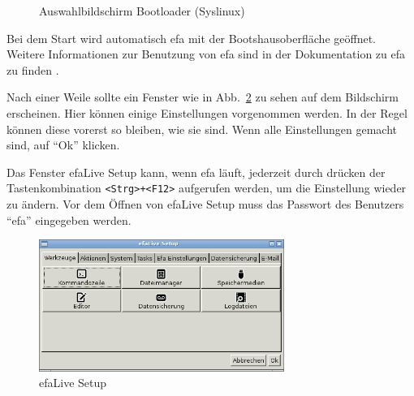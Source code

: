 \documentclass[a4paper,12pt,twoside]{article}
\begin{document}
\begin{figure}
    \centering
    \caption{Auswahlbildschirm Bootloader (Syslinux)}
    \label{fig:syslinux}
\end{figure}

Bei dem Start wird automatisch efa mit der Bootshausoberfläche geöffnet.
Weitere Informationen zur Benutzung von efa sind in der Dokumentation
zu efa zu finden \cite{EFA2}.

Nach einer Weile sollte ein Fenster wie in Abb.~\ref{fig:efalivesetup_live} zu
sehen auf dem Bildschirm erscheinen. Hier können einige Einstellungen vorgenommen
werden. In der Regel können diese vorerst so bleiben, wie sie sind. 
Wenn alle Einstellungen gemacht sind, auf "`Ok"' klicken.

Das Fenster efaLive Setup kann, wenn efa läuft, jederzeit durch drücken
der Tastenkombination \texttt{{\textless}Strg{\textgreater}+{\textless}F12{\textgreater}} 
aufgerufen
werden, um die Einstellung wieder zu ändern. Vor dem Öffnen von efaLive
Setup muss das Passwort des Benutzers "`efa"' eingegeben werden.

\begin{figure}
    \centering
    \includegraphics[width=8cm]{screenshots/efalive_setup.png}
    \caption{efaLive Setup}
    \label{fig:efalivesetup_live}
\end{figure}
\end{document}
